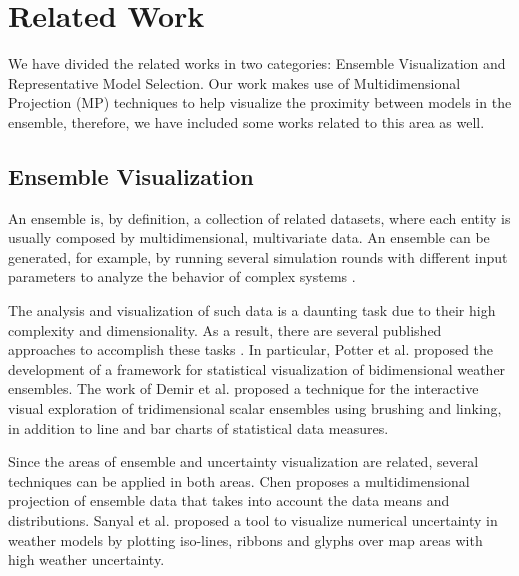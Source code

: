 \documentclass[final,5p,times,twocolumn]{elsarticle}
\begin{document}

\section{Related Work}
\label{sec:rel-work}
We have divided the related works in two categories: Ensemble Visualization and Representative Model Selection. Our work makes use of Multidimensional Projection (MP) techniques to help visualize the proximity between models in the ensemble, therefore, we have included some works related to this area as well.

\subsection{Ensemble Visualization}
An ensemble is, by definition, a collection of related datasets, where each entity is usually composed by multidimensional, multivariate data. An ensemble can be generated, for example, by running several simulation rounds with different input parameters to analyze the behavior of complex systems \cite{noodles-sanyal:2010}.

The analysis and visualization of such data is a daunting task due to their high complexity and dimensionality. As a result, there are several published approaches to accomplish these tasks \cite{phadke:2012, hlawitschka:2013, ensemblevis-potter:2009, multicharts-demir:2014}. In particular, Potter et al. \cite{ensemblevis-potter:2009} proposed the development of a framework for statistical visualization of bidimensional weather ensembles. The work of Demir et al. \cite{multicharts-demir:2014} proposed a technique for the interactive visual exploration of tridimensional scalar ensembles using brushing and linking, in addition to line and bar charts of statistical data measures.

Since the areas of ensemble and uncertainty visualization are related, several techniques can be applied in both areas. Chen \cite{uncert-proj-chen:2015} proposes a multidimensional projection of ensemble data that takes into account the data means and distributions. Sanyal et al. \cite{noodles-sanyal:2010} proposed a tool to visualize numerical uncertainty in weather models by plotting iso-lines, ribbons and glyphs over map areas with high weather uncertainty.
\end{document}
